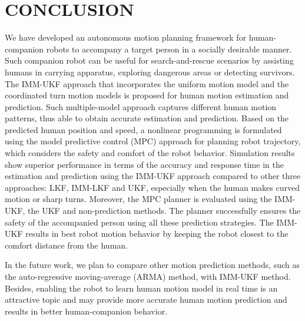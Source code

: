 \documentclass[letterpaper, 10 pt, conference]{ieeeconf}
\begin{document}
	\section{CONCLUSION}\label{sec:conclusion}
	We have developed an autonomous motion planning framework for human-companion robots to accompany a target person in a socially desirable manner.
	Such companion robot can be useful for search-and-rescue scenarios by assisting humans in carrying apparatus, exploring dangerous areas or detecting survivors.
	The IMM-UKF approach that incorporates the uniform motion model and the coordinated turn motion models is proposed for human motion estimation and prediction.
	Such multiple-model approach captures different human motion patterns, thus able to obtain accurate estimation and prediction.
	Based on the predicted human position and speed, a nonlinear programming is formulated using the model predictive control (MPC) approach for planning robot trajectory, which considers the safety and comfort of the robot behavior.
	Simulation results show superior performance in terms of the accuracy and response time in the estimation and prediction using the IMM-UKF approach compared to other three approaches: LKF, IMM-LKF and UKF, especially when the human makes curved motion or sharp turns.
	Moreover, the MPC planner is evaluated using the IMM-UKF, the UKF and non-prediction methods.
	The planner successfully ensures the safety of the accompanied person using all these prediction strategies.
	The IMM-UKF results in best robot motion behavior by keeping the robot closest to the comfort distance from the human.
	
	In the future work, we plan to compare other motion prediction methods, such as the auto-regressive moving-average (ARMA) method, with IMM-UKF method.
	Besides,  enabling the robot to learn human motion model in real time is an attractive topic and may provide more accurate human motion prediction and results in better human-companion behavior.
	
\end{document}
